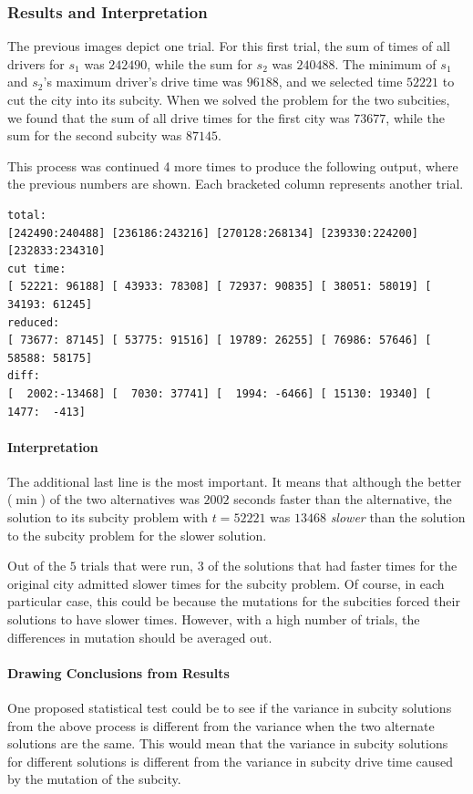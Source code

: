 \documentclass{article}
\begin{document}
\subsubsection{Results and Interpretation}
The previous images depict one trial.
For this first trial, the sum of times of all drivers for $s_1$ was $242490$, while the sum for $s_2$ was $240488$.
The minimum of $s_1$ and $s_2$'s maximum driver's drive time was $96188$, and we selected time $52221$ to cut the city into its subcity.
When we solved the problem for the two subcities, we found that the sum of all drive times for the first city was $73677$, while the sum for the second subcity was $87145$.

This process was continued 4 more times to produce the following output, where the previous numbers are shown.
Each bracketed column represents another trial.
\begin{verbatim}
total:
[242490:240488] [236186:243216] [270128:268134] [239330:224200] [232833:234310] 
cut time:
[ 52221: 96188] [ 43933: 78308] [ 72937: 90835] [ 38051: 58019] [ 34193: 61245] 
reduced:
[ 73677: 87145] [ 53775: 91516] [ 19789: 26255] [ 76986: 57646] [ 58588: 58175] 
diff:
[  2002:-13468] [  7030: 37741] [  1994: -6466] [ 15130: 19340] [  1477:  -413] 
\end{verbatim}

\paragraph{Interpretation}
The additional last line is the most important.
It means that although the better ($\min$) of the two alternatives was $2002$ seconds faster than the alternative, the solution to its subcity problem with $t=52221$ was $13468$ \emph{slower} than the solution to the subcity problem for the slower solution.

Out of the $5$ trials that were run, $3$ of the solutions that had faster times for the original city admitted slower times for the subcity problem.
Of course, in each particular case, this could be because the mutations for the subcities forced their solutions to have slower times.
However, with a high number of trials, the differences in mutation should be averaged out.

\paragraph{Drawing Conclusions from Results}
One proposed statistical test could be to see if the variance in subcity solutions from the above process is different from the variance when the two alternate solutions are the same.
This would mean that the variance in subcity solutions for different solutions is different from the variance in subcity drive time caused by the mutation of the subcity.
\end{document}
